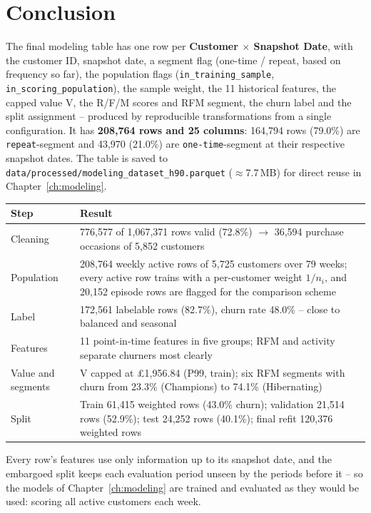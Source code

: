 \section{Conclusion}
\label{sec:5-7}

The final modeling table has one row per \textbf{Customer $\times$ Snapshot Date}, with the customer ID, snapshot date, a segment flag (one-time / repeat, based on frequency so far), the population flags (\texttt{in\_training\_sample}, \texttt{in\_scoring\_population}), the sample weight, the 11 historical features, the capped value V, the R/F/M scores and RFM segment, the churn label and the split assignment -- produced by reproducible transformations from a single configuration. It has \textbf{208,764 rows and 25 columns}: 164,794 rows (79.0\%) are \texttt{repeat}-segment and 43,970 (21.0\%) are \texttt{one-time}-segment at their respective snapshot dates. The table is saved to \texttt{data/processed/}\allowbreak\texttt{modeling\_dataset\_h90.parquet} ($\approx$7.7\,MB) for direct reuse in Chapter~\ref{ch:modeling}.

\begin{center}
\begin{tabular}{@{}p{3.4cm}p{10.7cm}@{}}
    \toprule
    Step & Result \\
    \midrule
    Cleaning & 776,577 of 1,067,371 rows valid (72.8\%) $\rightarrow$ 36,594 purchase occasions of 5,852 customers \\
    Population & 208,764 weekly active rows of 5,725 customers over 79 weeks; every active row trains with a per-customer weight $1/n_i$, and 20,152 episode rows are flagged for the comparison scheme \\
    Label & 172,561 labelable rows (82.7\%), churn rate 48.0\% -- close to balanced and seasonal \\
    Features & 11 point-in-time features in five groups; RFM and activity separate churners most clearly \\
    Value and segments & V capped at \pounds1,956.84 (P99, train); six RFM segments with churn from 23.3\% (Champions) to 74.1\% (Hibernating) \\
    Split & Train 61,415 weighted rows (43.0\% churn); validation 21,514 rows (52.9\%); test 24,252 rows (40.1\%); final refit 120,376 weighted rows \\
    \bottomrule
\end{tabular}
\end{center}

Every row's features use only information up to its snapshot date, and the embargoed split keeps each evaluation period unseen by the periods before it -- so the models of Chapter~\ref{ch:modeling} are trained and evaluated as they would be used: scoring all active customers each week.
